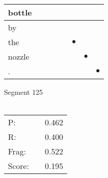 \documentclass[landscape]{article}
\newcommand{\ssp}{\hspace{2pt}}
\newcommand{\mex}{\cellcolor{g}$\bullet$}
\begin{document}
\begin{tabular}{|l|p{10pt}|p{10pt}|p{10pt}|p{10pt}|p{10pt}|p{10pt}|p{10pt}|}
\hline
\ssp bottle \ssp&\hspace{2pt}&\hspace{2pt}&\hspace{2pt}&\hspace{2pt}&\hspace{2pt}&\hspace{2pt}&\hspace{2pt}\\
\hline
\ssp by \ssp&\hspace{2pt}&\hspace{2pt}&\hspace{2pt}&\hspace{2pt}&\hspace{2pt}&\hspace{2pt}&\hspace{2pt}\\
\hline
\ssp \cellcolor{ref4}the \ssp&\hspace{2pt}&\hspace{2pt}&\hspace{2pt}&\hspace{2pt}&\hspace{2pt}\mex&\hspace{2pt}&\hspace{2pt}\\
\hline
\ssp \cellcolor{ref5}nozzle \ssp&\hspace{2pt}&\hspace{2pt}&\hspace{2pt}&\hspace{2pt}&\hspace{2pt}&\hspace{2pt}\mex&\hspace{2pt}\\
\hline
\ssp \cellcolor{ref6}. \ssp&\hspace{2pt}&\hspace{2pt}&\hspace{2pt}&\hspace{2pt}&\hspace{2pt}&\hspace{2pt}&\hspace{2pt}\mex\\
\hline
\end{tabular}

\vspace{6pt}
\noindent Segment 125\\\\
\noindent\begin{tabular}{lm{12pt}r}
\hline
P:&&0.462\\
R:&&0.400\\
Frag:&&0.522\\
Score:&&0.195\\
\end{tabular}
\end{document}

